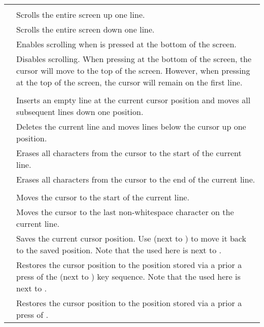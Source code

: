 \begin{center}
\begin{longtable}{c|L{5.5cm}}
  \hhline{==}
   \\
  \hhline{==}
  &
Scrolls the entire screen up one line.\\
\hline
{}  &
Scrolls the entire screen down one line.\\
\hline
{}  &
Enables scrolling when \megakey{$\downarrow$} is pressed at the bottom of the screen.\\
\hline
{}  &
Disables scrolling. When pressing \megakey{$\downarrow$} at the bottom of the screen, the cursor will move to the top of the
screen. However, when pressing \megakey{$\uparrow$} at the top of the screen, the cursor will remain on the first line.\\
  \hhline{==}
   \\
  \hhline{==}
  &
Inserts an empty line at the current cursor position and moves all subsequent lines down one position.\\
\hline
{}  &
Deletes the current line and moves lines below the cursor up one position.\\
\hline
{}  &
Erases all characters from the cursor to the start of the current line.\\
\hline
{}  &
Erases all characters from the cursor to the end of the current line.\\
  \hhline{==}
   \\
  \hhline{==}
  &
Moves the cursor to the start of the current line.\\
\hline
{}  &
Moves the cursor to the last non-whitespace character on the current line.\\
\hline
{} \megakeywhite{$\uparrow$} &
Saves the current cursor position. Use  \megakeywhite{$\leftarrow$} (next to ) to move it
    back
to the saved position. Note that the \megakeywhite{$\uparrow$} used here is next to .\\
\hline
{} \megakeywhite{$\leftarrow$} &
Restores the cursor position to the position stored via a prior a press of the 
    \megakeywhite{$\uparrow$}
(next to ) key sequence. Note that the \megakeywhite{$\leftarrow$} used here is next to .\\
\hline
{}  &
Restores the cursor position to the position stored via a prior a press of .\\


\end{longtable}
\end{center}
